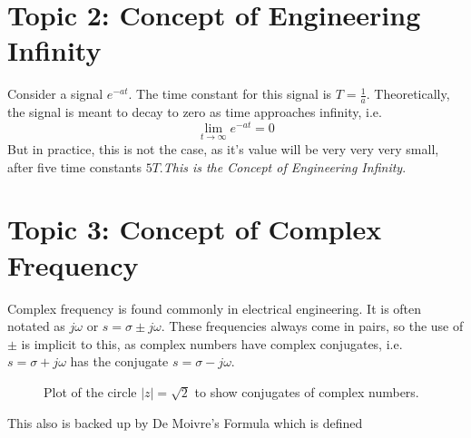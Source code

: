 \documentclass[12pt]{report}
\begin{document}
\section{Topic 2: Concept of Engineering Infinity}
Consider a signal \(e^{-at}\). The time constant for this signal is \(T = \frac{1}{a}\). Theoretically, the signal is meant to decay to zero as time approaches infinity, i.e.\[ \lim_{t \to \infty} e^{-at} = 0 \] But in practice, this is not the case, as it's value will be very very very small, after five time constants \(5T\).\emph{This is the Concept of Engineering Infinity}.
\section{Topic 3: Concept of Complex Frequency}
Complex frequency is found commonly in electrical engineering. It is often notated as \( j\omega \) or \( s = \sigma \pm j \omega \). These frequencies always come in pairs, so the use of \( \pm \) is implicit to this, as complex numbers have complex conjugates, i.e.
\(s = \sigma + j \omega \) has the conjugate \(s = \sigma - j\omega \).
\begin{figure}[H]
    \centering
    \usetikzlibrary{arrows.meta}
    \caption{Plot of the circle \(|z| = \sqrt{2}\) to show conjugates of complex numbers.}\label{fig:pgfplots-complex-plane}
\end{figure}
\noindent
This also is backed up by De Moivre's Formula which is defined
\end{document}
